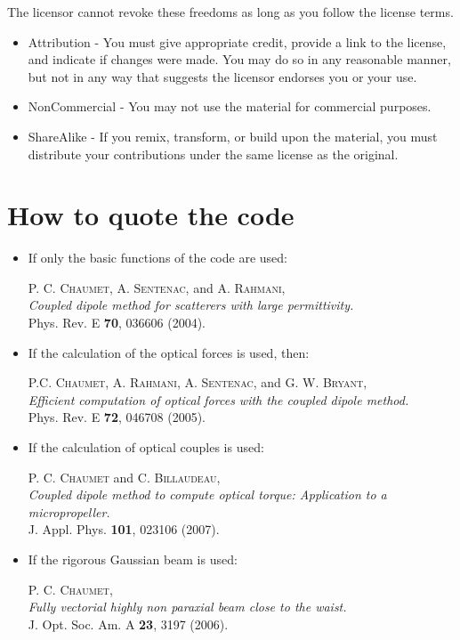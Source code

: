 The licensor cannot revoke these freedoms as long as you follow the
license terms.
\begin{itemize}
\item Attribution - You must give appropriate credit, provide a link
  to the license, and indicate if changes were made. You may do so in
  any reasonable manner, but not in any way that suggests the licensor
  endorses you or your use.
\item NonCommercial - You may not use the material for commercial
  purposes.
\item ShareAlike - If you remix, transform, or build upon the
  material, you must distribute your contributions under the same
  license as the original.
\end{itemize}


\section{How to quote the code}

\begin{itemize}

\item If only the basic functions of the code are used:

P. C. {\textsc{Chaumet}}, A. {\textsc{Sentenac}}, and
A. {\textsc{Rahmani}}, \\{\it Coupled dipole method for scatterers
  with large permittivity.}\\
Phys. Rev. E {\bf 70}, 036606 (2004).

\item If the calculation of the optical forces is used, then:

P.C. {\textsc{Chaumet}}, A. {\textsc{Rahmani}},
A. {\textsc{Sentenac}}, and G. W. {\textsc{Bryant}},\\ {\it Efficient
  computation of optical forces with the coupled dipole method.}\\
Phys. Rev. E {\bf 72}, 046708 (2005).

\item If the calculation of optical couples is used:

P. C. {\textsc{Chaumet}} and C. {\textsc{Billaudeau}},\\ {\it Coupled
  dipole method to compute optical torque: Application to a
  micropropeller.}\\
J. Appl. Phys. {\bf 101}, 023106 (2007).

\item If the rigorous Gaussian beam is used:

P. C. {\textsc{Chaumet}},\\ {\it Fully vectorial highly non
  paraxial beam close to the waist.}\\
J. Opt. Soc. Am. A {\bf 23}, 3197 (2006).

\end{itemize}
